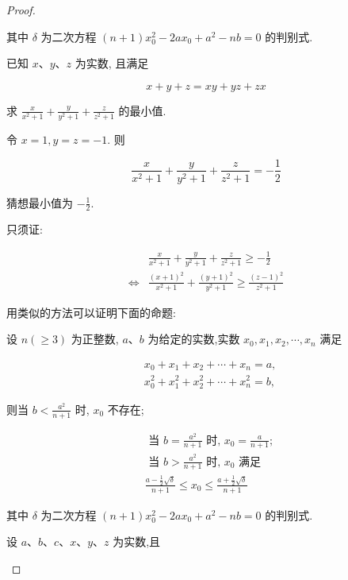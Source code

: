\begin{proof}
\begin{example}
\begin{solution}
\begin{note}
	其中 $\delta$ 为二次方程 $(n+1) x_{0}^{2}-2 a x_{0}+a^{2}-n b=0$ 的判别式.
\end{note}

\begin{example}
	已知 $x 、 y 、 z$ 为实数, 且满足
	
	$$
	x+y+z=x y+y z+z x
	$$
	
	求 $\frac{x}{x^{2}+1}+\frac{y}{y^{2}+1}+\frac{z}{z^{2}+1}$ 的最小值.
\end{example}
\begin{solution}
	令 $x=1, y=z=-1$. 则
	
	$$
	\frac{x}{x^{2}+1}+\frac{y}{y^{2}+1}+\frac{z}{z^{2}+1}=-\frac{1}{2}
	$$
	
	猜想最小值为 $-\frac{1}{2}$.
	
	只须证:
	
	
	\begin{align*}
	& \frac{x}{x^{2}+1}+\frac{y}{y^{2}+1}+\frac{z}{z^{2}+1} \geqslant-\frac{1}{2} \\
	\Leftrightarrow & \frac{(x+1)^{2}}{x^{2}+1}+\frac{(y+1)^{2}}{y^{2}+1} \geqslant \frac{(z-1)^{2}}{z^{2}+1} \tag{1}
	\end{align*}
\end{solution}
\begin{note}
	用类似的方法可以证明下面的命题:
	
	设 $n(\geqslant 3)$ 为正整数, $a 、 b$ 为给定的实数,实数 $x_{0}, x_{1}, x_{2}, \cdots, x_{n}$ 满足
	
	$$
	\begin{aligned}
	& x_{0}+x_{1}+x_{2}+\cdots+x_{n}=a, \\
	& x_{0}^{2}+x_{1}^{2}+x_{2}^{2}+\cdots+x_{n}^{2}=b,
	\end{aligned}
	$$
	
	则当 $b<\frac{a^{2}}{n+1}$ 时, $x_{0}$ 不存在;
	
	$$
	\begin{aligned}
	& \text { 当 } b=\frac{a^{2}}{n+1} \text { 时, } x_{0}=\frac{a}{n+1} \text {; } \\
	& \text { 当 } b>\frac{a^{2}}{n+1} \text { 时, } x_{0} \text { 满足 } \\
	& \frac{a-\frac{1}{2} \sqrt{\delta}}{n+1} \leqslant x_{0} \leqslant \frac{a+\frac{1}{2} \sqrt{\delta}}{n+1}
	\end{aligned}
	$$
	
	其中 $\delta$ 为二次方程 $(n+1) x_{0}^{2}-2 a x_{0}+a^{2}-n b=0$ 的判别式.
\end{note}

\begin{example}
	设 $a 、 b 、 c 、 x 、 y 、 z$ 为实数,且
	

\end{example}
\end{solution}
\end{example}
\end{proof}
